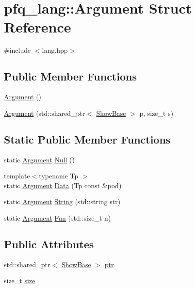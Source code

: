 \hypertarget{structpfq__lang_1_1Argument}{\section{pfq\+\_\+lang\+:\+:Argument Struct Reference}
\label{structpfq__lang_1_1Argument}
}


{\ttfamily \#include $<$lang.\+hpp$>$}

\subsection*{Public Member Functions}
\begin{DoxyCompactItemize}
\item 
\hyperlink{structpfq__lang_1_1Argument_adf4a0f9046574c815af1031d6c5cd851}{Argument} ()
\item 
\hyperlink{structpfq__lang_1_1Argument_afcd49979abbdf7430421f17bebb1966c}{Argument} (std\+::shared\+\_\+ptr$<$ \hyperlink{structpfq__lang_1_1ShowBase}{Show\+Base} $>$ p, size\+\_\+t s)
\end{DoxyCompactItemize}
\subsection*{Static Public Member Functions}
\begin{DoxyCompactItemize}
\item 
static \hyperlink{structpfq__lang_1_1Argument}{Argument} \hyperlink{structpfq__lang_1_1Argument_a8efc5284160dc24e835ed65b40d988fa}{Null} ()
\item 
{\footnotesize template$<$typename Tp $>$ }\\static \hyperlink{structpfq__lang_1_1Argument}{Argument} \hyperlink{structpfq__lang_1_1Argument_abea434bf421fbbb77e8d6ca473157763}{Data} (Tp const \&pod)
\item 
static \hyperlink{structpfq__lang_1_1Argument}{Argument} \hyperlink{structpfq__lang_1_1Argument_ae348374ab6b6842216f54f93c17685e0}{String} (std\+::string str)
\item 
static \hyperlink{structpfq__lang_1_1Argument}{Argument} \hyperlink{structpfq__lang_1_1Argument_afc98cc699af5ba4ff12d708410e575f0}{Fun} (std\+::size\+\_\+t n)
\end{DoxyCompactItemize}
\subsection*{Public Attributes}
\begin{DoxyCompactItemize}
\item 
std\+::shared\+\_\+ptr$<$ \hyperlink{structpfq__lang_1_1ShowBase}{Show\+Base} $>$ \hyperlink{structpfq__lang_1_1Argument_a06431bd31fa48d87ed7e4d35b27b6dbc}{ptr}
\item 
size\+\_\+t \hyperlink{structpfq__lang_1_1Argument_a32994135620ce25900736514464f04f4}{size}
\end{DoxyCompactItemize}


